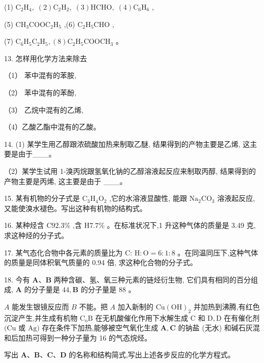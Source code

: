 \documentclass[10pt]{article}
\begin{document}
(1) \({\mathrm{C}}_{2}{\mathrm{H}}_{4},\;\left( 2\right) {\mathrm{C}}_{2}{\mathrm{H}}_{2},\;\left( 3\right) \mathrm{{HCHO}},\;\left( 4\right) {\mathrm{C}}_{6}{\mathrm{H}}_{6}\) ,

(5) \({\mathrm{{CH}}}_{3}{\mathrm{{COOC}}}_{2}{\mathrm{H}}_{5}\) ,(6) \({\mathrm{C}}_{2}{\mathrm{H}}_{5}\mathrm{{CHO}}\) ,

(7) \({\mathrm{C}}_{6}{\mathrm{H}}_{5}{\mathrm{C}}_{2}{\mathrm{H}}_{5},\left( 8\right) {\mathrm{C}}_{2}{\mathrm{H}}_{5}{\mathrm{{COOCH}}}_{3}\) 。

13. 怎样用化学方法来除去

（1） 苯中混有的苯胺,

（2） 苯中混有的苯酚,

（3） 乙烷中混有的乙烯,

（4）乙酸乙酯中混有的乙酸。

14. (1) 某学生用乙醇跟浓硫酸加热来制取乙醚, 结果得到的产物主要是乙烯, 这主要是由于\_\_\_。

（2）某学生试用 1-溴丙烷跟氢氧化钠的乙醇溶液起反应来制取丙醇, 结果得到的产物主要是丙烯, 这主要是由于 \_\_\_。

15. 某有机物的分子式是 \({\mathrm{C}}_{3}{\mathrm{H}}_{4}{\mathrm{O}}_{2}\) ,它的水溶液显酸性, 能跟 \({\mathrm{{Na}}}_{2}{\mathrm{{CO}}}_{3}\) 溶液起反应,又能使溴水褪色。写出这种有机物的结构式。

16. 某种烃含 \(\mathrm{C}{92.3}\%\) ,含 \(\mathrm{H}{7.7}\%\) 。在标准状况下,1 升这种气体的质量是 3.49 克, 求这种烃的分子式。

17. 某气态化合物中各元素的质量比为 C: \(\mathrm{H} : \mathrm{O} = 6 : 1 : 8\) 。在同温同压下,这种气体的质量是同体积氧气质量的 0.94 倍, 求这种化合物的分子式。

18. 今有 \(\mathbf{A}\text{、}\mathbf{B}\) 两种含碳、氢、氧三种元素的链烃衍生物, 它们具有相同的百分组成, \(\mathbf{A}\) 的分子量是 \({44},\mathbf{B}\) 的分子量是 88 。

\(A\) 能发生银镜反应而 \(B\) 不能。把 \(A\) 加入新制的 \(\mathrm{{Cu}}{\left( \mathrm{{OH}}\right) }_{2}\) 并加热到沸腾,有红色沉淀产生,并生成有机物 \({\mathrm{C}}_{\mathrm{o}}\mathrm{B}\) 在无机酸催化作用下水解生成 \(\mathrm{C}\) 和 \(\mathrm{D},\mathrm{D}\) 在有催化剂 \((\mathrm{{Cu}}\) 或 \(\mathrm{{Ag}})\) 存在条件下加热,能够被空气氧化生成 \(\mathbf{A},\mathbf{C}\) 的钠盐 (无水) 和碱石灰混和后加热可得到一种分子量为 16 的气态烷烃。

写出 \(\mathbf{A}\text{、}\mathbf{B}\text{、}\mathbf{C}\text{、}\mathbf{D}\) 的名称和结构简式,写出上述各步反应的化学方程式。
\end{document}
